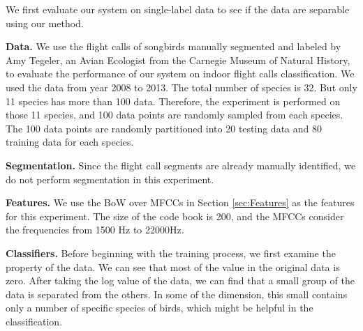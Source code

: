 \documentclass{article} %
\begin{document}
We first evaluate our system on single-label data to see if the data are separable using our method.


\textbf{Data.}  We use the flight calls of songbirds manually segmented and labeled by Amy Tegeler, an Avian Ecologist from the Carnegie Museum of Natural History, to evaluate the performance of our system on indoor flight calls classification. We used the data from year 2008 to 2013. The total number of species is 32. But only 11 species has more than 100 data. Therefore, the experiment is performed on those 11 species, and 100 data points are randomly sampled from each species. The 100 data points are randomly partitioned into 20 testing data and 80 training data for each species.

\textbf{Segmentation.}
Since the flight call segments are already manually identified, we do not perform segmentation in this experiment.

\textbf{Features.}
We use the BoW over MFCCs in Section \ref{sec:Features} as the features for this experiment. The size of the code book is 200, and the MFCCs consider the frequencies from 1500 Hz to 22000Hz.

\textbf{Classifiers.}
Before beginning with the training process, we first examine the property of the data. We can see that most of the value in the original data is zero. After taking the log value of the data, we can find that a small group of the data is separated from the others. In some of the dimension, this small contains only a number of specific species of birds, which might be helpful in the classification.
\end{document}
